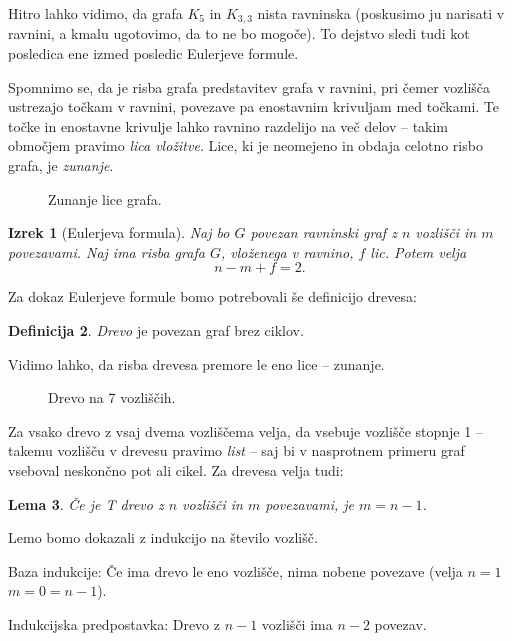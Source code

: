 \documentclass[12pt,a4paper]{amsart}
\theoremstyle{definition} %
\newtheorem{definicija}{Definicija}[section]
\theoremstyle{plain} %
\newtheorem{lema}[definicija]{Lema}
\newtheorem{izrek}[definicija]{Izrek}
\begin{document}
Hitro lahko vidimo, da grafa $K_5$ in $K_{3,3}$ nista ravninska (poskusimo ju narisati v ravnini, a kmalu ugotovimo, da to ne bo mogoče). To dejstvo sledi tudi kot posledica ene izmed posledic Eulerjeve formule.

Spomnimo se, da je risba grafa predstavitev grafa v ravnini, pri čemer vozlišča ustrezajo točkam v ravnini, povezave pa enostavnim krivuljam med točkami. Te točke in enostavne krivulje lahko ravnino razdelijo na več delov -- takim območjem pravimo \emph{lica vložitve}. Lice, ki je neomejeno in obdaja celotno risbo grafa, je \emph{zunanje}.

\begin{figure}[h]
    \caption{Zunanje lice grafa.}
\end{figure}

\begin{izrek}[Eulerjeva formula]
    \label{izr:euler-formula}
    Naj bo $G$ povezan ravninski graf z $n$ vozlišči in $m$ povezavami. Naj ima risba grafa $G$, vloženega v ravnino, $f$ lic. Potem velja
    \[ n - m + f = 2 .\]
\end{izrek}

Za dokaz Eulerjeve formule bomo potrebovali še definicijo drevesa:

\begin{definicija}
    \emph{Drevo} je povezan graf brez ciklov.
\end{definicija}

Vidimo lahko, da risba drevesa premore le eno lice -- zunanje.

\begin{figure}[h]
    \caption{Drevo na 7 vozliščih.}
\end{figure}

Za vsako drevo z vsaj dvema vozliščema velja, da vsebuje vozlišče stopnje 1 -- takemu vozlišču v drevesu pravimo \emph{list} -- saj bi v nasprotnem primeru graf vseboval neskončno pot ali cikel. Za drevesa velja tudi:

\begin{lema}
    Če je T drevo z $n$ vozlišči in $m$ povezavami, je $m=n-1$.
\end{lema}

\proof
    Lemo bomo dokazali z indukcijo na število vozlišč.
    
    Baza indukcije: Če ima drevo le eno vozlišče, nima nobene povezave (velja $n = 1$ $m = 0 = n-1$).
    
    Indukcijska predpostavka: Drevo z $n-1$ vozlišči ima $n-2$ povezav.
    
\end{document}
